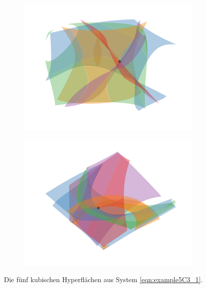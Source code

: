 \documentclass[11pt]{beamer}
\theoremstyle{custom}
\theoremstyle{custom}
\begin{document}
	\begin{frame}
		\begin{figure}[H]
			\label{img:example10}
			\centering
			\begin{subfigure}[b]{0.45\textwidth}
				\includegraphics[width=\textwidth]{"images/e5c3_example1.png"}
			\end{subfigure}
			\begin{subfigure}[b]{0.45\textwidth}
				\includegraphics[width=\textwidth]{"images/e5c3_example1_angle.png"}
			\end{subfigure}
			\caption{Die fünf kubischen Hyperflächen aus System \eqref{eqn:example5C3_1}.}
		\end{figure}
	\end{frame}
\end{document}
